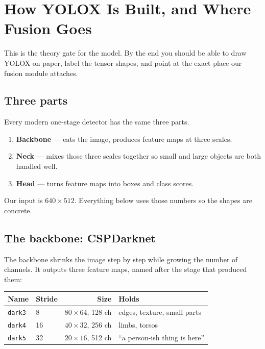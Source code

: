 \documentclass[../main.tex]{subfiles}
\begin{document}
\chapter{How YOLOX Is Built, and Where Fusion Goes}

This is the theory gate for the model. By the end you should be able to draw YOLOX on paper,
label the tensor shapes, and point at the exact place our fusion module attaches.

\section{Three parts}

Every modern one-stage detector has the same three parts.

\begin{enumerate}
  \item \textbf{Backbone} --- eats the image, produces feature maps at three scales.
  \item \textbf{Neck} --- mixes those three scales together so small and large objects are both
        handled well.
  \item \textbf{Head} --- turns feature maps into boxes and class scores.
\end{enumerate}

Our input is $640\times512$. Everything below uses those numbers so the shapes are concrete.

\section{The backbone: CSPDarknet}

The backbone shrinks the image step by step while growing the number of channels. It outputs
three feature maps, named after the stage that produced them:

\begin{center}
\begin{tabular}{llrl}
\toprule
Name & Stride & Size & Holds \\
\midrule
\texttt{dark3} & 8  & $80\times64$, 128 ch & edges, texture, small parts \\
\texttt{dark4} & 16 & $40\times32$, 256 ch & limbs, torsos \\
\texttt{dark5} & 32 & $20\times16$, 512 ch & ``a person-ish thing is here'' \\
\bottomrule
\end{tabular}
\end{center}
\end{document}
